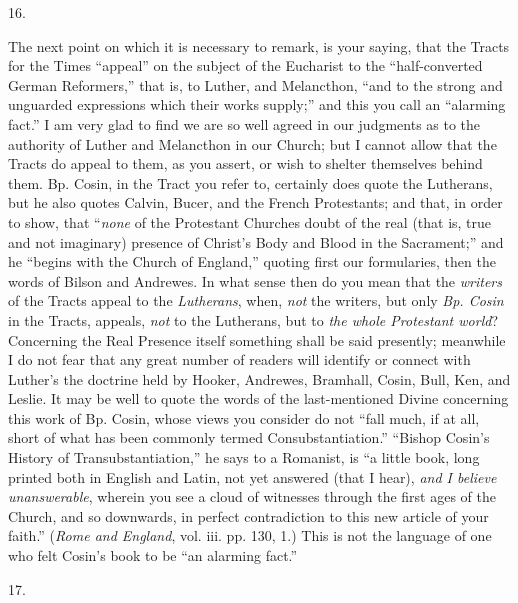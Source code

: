 16.

The next point on which it is necessary to
remark, is your saying, that the Tracts for the Times ``appeal'' on
the subject of the Eucharist to the ``half-converted German
Reformers,'' that is, to Luther, and Melancthon, ``and to the strong
and unguarded expressions which their works supply;'' and this you
call an ``alarming fact.'' I am very glad to find we are so well
agreed in our judgments as to the authority of Luther and Melancthon
in our Church; but I cannot allow that the Tracts do appeal to them,
as you assert, or wish to shelter themselves behind them. Bp. Cosin,
in the Tract you refer to, certainly does quote the Lutherans, but he
also quotes Calvin, Bucer, and the French Protestants; and that, in
order to show, that ``\emph{none} of the Protestant Churches doubt of
the real (that is, true and not imaginary) presence of Christ's Body
and Blood in the Sacrament;'' and he ``begins with the Church of
England,'' quoting first our formularies, then the words of Bilson
and Andrewes. In what sense then do you mean that the \emph{writers}
of the Tracts appeal to the \emph{Lutherans}, when, \emph{not} the
writers, but only \emph{Bp. Cosin} in the Tracts, appeals, \emph{not}
to the Lutherans, but to \emph{the whole Protestant world}? Concerning
the Real Presence itself something shall be said presently; meanwhile
I do not fear that any great number of readers will identify or
connect with Luther's the doctrine held by Hooker, Andrewes,
Bramhall, Cosin, Bull, Ken, and Leslie. It may be well to quote the
words of the last-mentioned Divine concerning this work of Bp. Cosin,
whose views you consider do not ``fall much, if at all, short of what
has been commonly termed Consubstantiation.'' ``Bishop Cosin's
History of Transubstantiation,'' he says to a Romanist, is ``a
little book, long printed both in English and Latin, not yet answered
(that I hear), \emph{and I believe unanswerable}, wherein you see a
cloud of witnesses through the first ages of the Church, and so
downwards, in perfect contradiction to this new article of your
faith.'' (\emph{Rome and England}, vol. iii. pp. 130, 1.) This is not
the language of one who felt Cosin's book to be ``an alarming
fact.''

17.

